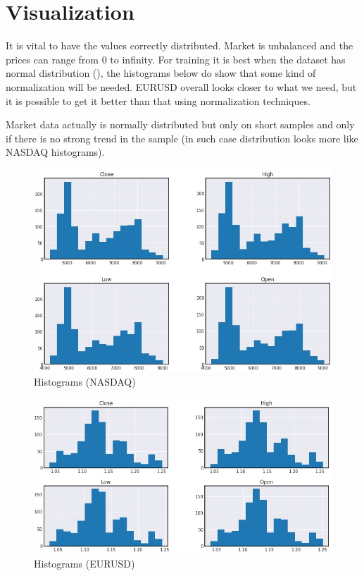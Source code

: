 \documentclass[a4paper,12pt]{article}
\begin{document}
\section{Visualization}
It is vital to have the values correctly distributed. Market is unbalanced and the prices can range from 0 to infinity. For training it is best when the dataset has normal distribution (\cite{Distribution}), the histograms below do show that some kind of normalization will be needed.
EURUSD overall looks closer to what we need, but it is possible to get it better than that using normalization techniques.

Market data actually is normally distributed but only on short samples and only if there is no strong trend in the sample (in such case distribution looks more like NASDAQ histograms).

\begin{figure}[h]
	\centering
	\includegraphics[scale=2.2]{nasdaqHist}
	\caption{Histograms (NASDAQ)}
\end{figure}
\begin{figure}[h]
	\centering
	\includegraphics[scale=2.2]{eurusdHist}
	\caption{Histograms (EURUSD)}
\end{figure}
\end{document}

